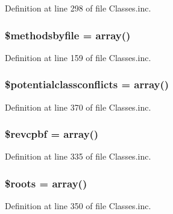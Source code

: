 \-Definition at line 298 of file \-Classes.\-inc.

\hypertarget{class_classes_ac74d15bf01d2ee54e7eb9d42b234170e}{
\subsubsection[{\$methodsbyfile}]{\setlength{\rightskip}{0pt plus 5cm}\$methodsbyfile = array()}}\label{class_classes_ac74d15bf01d2ee54e7eb9d42b234170e}


\-Definition at line 159 of file \-Classes.\-inc.

\hypertarget{class_classes_a9f4fb9165292699992be027973f44e7a}{
\subsubsection[{\$potentialclassconflicts}]{\setlength{\rightskip}{0pt plus 5cm}\$potentialclassconflicts = array()}}\label{class_classes_a9f4fb9165292699992be027973f44e7a}


\-Definition at line 370 of file \-Classes.\-inc.

\hypertarget{class_classes_a7b960874a2bd62df1a63a44e7d1c9fbc}{
\subsubsection[{\$revcpbf}]{\setlength{\rightskip}{0pt plus 5cm}\$revcpbf = array()}}\label{class_classes_a7b960874a2bd62df1a63a44e7d1c9fbc}


\-Definition at line 335 of file \-Classes.\-inc.

\hypertarget{class_classes_a1263b69321a1f7d5d4fa51ccf2cf7206}{
\subsubsection[{\$roots}]{\setlength{\rightskip}{0pt plus 5cm}\$roots = array()}}\label{class_classes_a1263b69321a1f7d5d4fa51ccf2cf7206}


\-Definition at line 350 of file \-Classes.\-inc.

